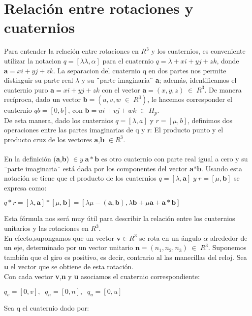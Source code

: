\documentclass[12pt,a4paper]{report}
\begin{document}
\section{Relación entre rotaciones y cuaternios}
Para entender la relación entre rotaciones en $R^{3}$ y los cuaternios, es conveniente utilizar la notacion $q=[\lambda\lambda,\alpha]$ para el cuaternio $q=\lambda+xi+yj+zk$, donde $\textbf{a}=xi+yj+zk$. La separacion del cuaternio q en dos partes nos permite distinguir su parte real $\lambda$ y su ¨parte imaginaria¨ \textbf{a}; además, identificamos el cuaternio puro $\textbf{a}=xi+yj+zk$ con el vector $\textbf{a}=(x,y,z)\; \in\;R^{3}$. De manera recíproca, dado un vector $\textbf{b}=(u,v,w \;\in\;R^{3})$, le hacemos corresponder el cuaternio $qb=[0,b]$, con $\textbf{b}=ui+vj+wk \;\in\; H_{p}$.\\
De esta manera, dado los cuaternios $q=[\lambda,a]$ y $r=[\mu,b]$, definimos dos operaciones entre las partes  imaginarias de q y r: El producto punto y el producto cruz de los vectores \textbf{a},\textbf{b} $\in R^{3}$.\\\\En la definición (\textbf{a},\textbf{b}) $\in y\; \textbf{a}*\textbf{b}$ es otro cuaternio con parte real igual a cero y su ¨parte imaginaria¨ está dada por los componentes del vector \textbf{a}*\textbf{b}. Usando esta notación se tiene que el producto de los cuaternios $q=[\lambda,\textbf{a}] \; y\;r=[\mu,\textbf{b}]$ se expresa como:\\
\begin{center}
$q*r=[\lambda,\textbf{a}]*[\mu,\textbf{b}]=[\lambda\mu-(\textbf{a},\textbf{b}),\lambda\textbf{b}+\mu\textbf{a}+\textbf{a}*\textbf{b}]$
\end{center}
Esta fórmula nos será muy útil para describir la relación entre los cuaternios unitarios y las rotaciones en $R^{3}$.\\
En efecto,supongamos que un vector $\textbf{v} \in R^{3}$ se rota en un ángulo $\alpha$ alrededor de un eje, determinado por un vector unitario $\textbf{n}=(n_{1},n_{2},n_{3})\; \in\;R^{3}$. Suponemos también que el giro es positivo, es decir, contrario al las manecillas del reloj. Sea \textbf{u} el vector que se obtiene de esta rotación.\\
Con cada vector \textbf{v},\textbf{n} y \textbf{u} asociamos el cuaternio correspondiente:
\begin{center}
$q_{v}=[0,v],\;\; q_{n}=[0,n],\;\; q_{u}=[0,u]$
\end{center}
Sea q el cuaternio dado por:\\
\end{document}
